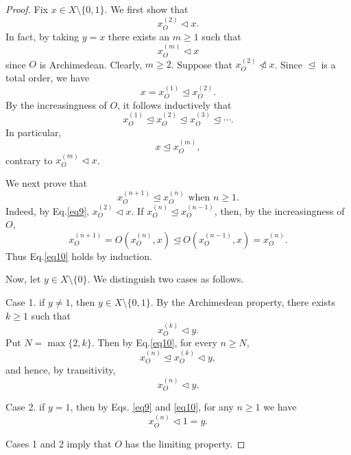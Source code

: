 \documentclass[preprint,12pt]{elsarticle}
\begin{document}
\begin{proof}
Fix $x\in X\setminus\{0,1\}$. We first show that
\begin{equation}\label{eq9}x_O^{(2)}\triangleleft x.
\end{equation}
In fact, by taking $y=x$ there exists an $m\ge1$ such that
$$
x_O^{(m)}\triangleleft x
$$
since $O$ is Archimedean. Clearly, $m\ge2$. Suppose that $x_O^{(2)}\ntriangleleft x$. Since $\trianglelefteq$ is a total order, we have
$$
x=x_O^{(1)}\trianglelefteq x_O^{(2)}.
$$
By the increasingness of $O$, it follows inductively that
$$
x_O^{(1)}\trianglelefteq x_O^{(2)}
\trianglelefteq x_O^{(3)}
\trianglelefteq\cdots.
$$
In particular,
$$
x\trianglelefteq x_O^{(m)},
$$
contrary to $x_O^{(m)}\triangleleft x$.

We next prove that
\begin{equation}\label{eq10}
x_O^{(n+1)}\trianglelefteq x_O^{(n)}\mbox{ when }n\ge1.
\end{equation}
Indeed, by Eq.\eqref{eq9}, $x_O^{(2)}\triangleleft x$. If
$x_O^{(n)}\trianglelefteq x_O^{(n-1)}$, then, by the increasingness of $O$,
$$
x_O^{(n+1)}
=O(x_O^{(n)},x)
\trianglelefteq
O(x_O^{(n-1)},x)
=x_O^{(n)}.
$$
Thus Eq.\eqref{eq10} holds by induction.

Now, let $y\in X\setminus \{0\}$. We distinguish two cases as follows.

Case 1. if $y\neq1$, then
$y\in X\setminus\{0,1\}$. By the Archimedean property, there exists
$k\ge1$ such that
$$
x_O^{(k)}\triangleleft y.
$$
Put $N=\max\{2,k\}$. Then by Eq.\eqref{eq10}, for every
$n\ge N$,
$$
x_O^{(n)}
\trianglelefteq x_O^{(k)}
\triangleleft y,
$$
and hence, by transitivity,
$$
x_O^{(n)}\triangleleft y.
$$

Case 2. if $y=1$, then by Eqs. \eqref{eq9} and \eqref{eq10}, for any $n\ge1$ we have
$$
x_O^{(n)}\triangleleft1=y.
$$

Cases 1 and 2 imply that $O$ has the
limiting property.
\end{proof}
\end{document}
